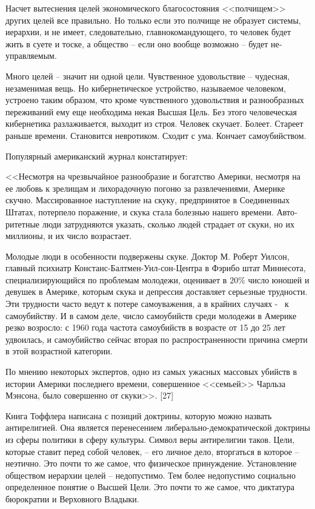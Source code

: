 \documentclass{book}
\begin{document}
Насчет вытеснения целей экономического благосостояния <<полчищем>> других целей все правильно. Но только если это полчище не образует системы, иерархии,  и не имеет, следовательно, главнокомандующего, то человек будет жить в суете и тоске, а общество -- если оно вообще возможно -- будет не­управляемым.

Много целей -- значит ни одной цели. Чувственное удовольст­вие -- чудесная, незаменимая вещь. Но кибернетическое устрой­ство, называемое человеком, устроено таким образом, что кро­ме чувственного удовольствия и разнообразных переживаний ему еще необходима некая Высшая Цель. Без этого человече­ская кибернетика разлаживается, выходит из строя. Человек ску­чает. Болеет. Стареет раньше времени. Становится невротиком. Сходит с ума. Кончает самоубийством.

Популярный американский журнал констатирует:

<<Несмотря на чрезвычайное разнообразие и богатство Аме­рики, несмотря на ее любовь к зрелищам и лихорадочную пого­ню за развлечениями, Америке скучно. Массированное насту­пление на скуку, предпринятое в Соединенных Штатах, потер­пело поражение, и скука стала болезнью нашего времени. Авто­ритетные люди затрудняются указать, сколько людей страдает от скуки, но их миллионы, и их число возрастает.

Молодые люди в особенности подвержены скуке. Доктор М. Роберт Уилсон, главный психиатр Констанс-Балтмен-Уил-сон-Центра в Фэрибо штат Миннесота, специализирующийся по проблемам молодежи, оценивает в $20\%$ число юношей и де­вушек в Америке, которым скука и депрессия доставляет се­рьезные трудности. Эти трудности часто ведут к потере самоува­жения, а в крайних случаях -  к самоубийству. И в самом деле, число самоубийств среди молодежи в Америке резко возрос­ло: с 1960 года частота самоубийств в возрасте от 15 до 25 лет удвоилась, и самоубийство сейчас вторая по распространенно­сти причина смерти в этой возрастной категории.

По мнению некоторых экспертов, одно из самых ужасных массовых убийств в истории Америки последнего времени, совершенное <<семьей>> Чарльза Мэнсона, было совершенно от скуки>>. [27]

Книга Тоффлера написана с позиций доктрины, которую мож­но назвать антирелигией.  Она является перенесением либераль­но-демократической доктрины из сферы политики в сферу культуры. Символ веры антирелигии таков. Цели, которые ставит перед собой человек, -- его личное дело, вторгаться в которое -- неэтично. Это почти то же самое, что физическое принуждение. Установление обществом иерархии целей -- недопустимо. Тем более недопустимо социально определенное понятие о Высшей Цели. Это почти то же самое, что диктатура бюрократии и Вер­ховного Владыки.
\end{document}
